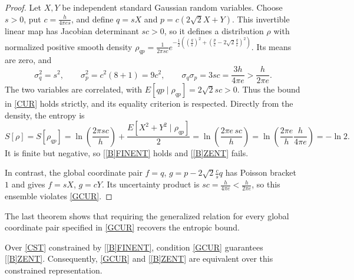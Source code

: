 \documentclass{techbrief}
\begin{document}
\begin{proof}
	Let $X,Y$ be independent standard Gaussian random variables. Choose $s>0$, put $c=\frac{h}{4\pi e s}$, and define $q=sX$ and $p=c(2\sqrt{2}X+Y)$. This invertible linear map has Jacobian determinant $sc>0$, so it defines a distribution $\rho$ with normalized positive smooth density $\rho_{qp}=\frac{1}{2\pi sc}e^{-\frac{1}{2}((\frac{q}{s})^2+(\frac{p}{c}-2\sqrt{2}\frac{q}{s})^2)}$. Its means are zero, and
	\begin{equation*}
		\sigma_q^2=s^2,\qquad \sigma_p^2=c^2(8+1)=9c^2,\qquad
		\sigma_q\sigma_p=3sc=\frac{3h}{4\pi e}>\frac{h}{2\pi e}.
	\end{equation*}
	The two variables are correlated, with $E[qp\mid\rho_{qp}]=2\sqrt{2}sc>0$. Thus the bound in \ref{CUR} holds strictly, and its equality criterion is respected. Directly from the density, the entropy is
	\begin{equation*}
		S[\rho]=S[\rho_{qp}]=\ln\left(\frac{2\pi sc}{h}\right)+\frac{E[X^2+Y^2\mid\rho_{qp}]}{2}
		=\ln\left(\frac{2\pi e\,sc}{h}\right)
		=\ln\left(\frac{2\pi e}{h}\frac{h}{4\pi e}\right)=-\ln2.
	\end{equation*}
	It is finite but negative, so \ref{[B]FINENT} holds and \ref{[B]ZENT} fails.

	In contrast, the global coordinate pair $f=q$, $g=p-2\sqrt{2}\frac{c}{s}q$ has Poisson bracket $1$ and gives $f=sX$, $g=cY$. Its uncertainty product is $sc=\frac{h}{4\pi e}<\frac{h}{2\pi e}$, so this ensemble violates \ref{GCUR}.
\end{proof}

The last theorem shows that requiring the generalized relation for every global coordinate pair specified in \ref{GCUR} recovers the entropic bound.

\begin{thrm}\label{uncertaintyImpliesEntropy}
	Over \ref{CST} constrained by \ref{[B]FINENT}, condition \ref{GCUR} guarantees \ref{[B]ZENT}. Consequently, \ref{GCUR} and \ref{[B]ZENT} are equivalent over this constrained representation.
\end{thrm}
\end{document}
